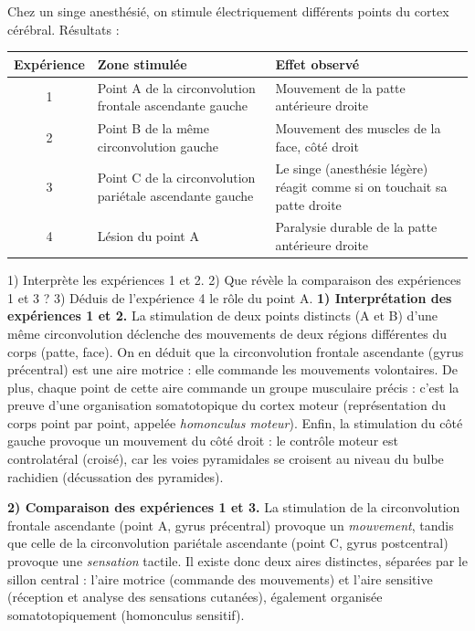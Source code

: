 \documentclass[11pt]{article}
\newcommand{\cle}[1]{{\popxbold\color{popdark}#1}}
\begin{document}
\begin{exoresolu}
Chez un singe anesthésié, on stimule électriquement différents points du cortex cérébral. Résultats :

\begin{center}
\begin{tabularx}{\linewidth}{|c|X|X|}
\hline
\rowcolor{popblueL} Expérience & Zone stimulée & Effet observé \\
\hline
1 & Point A de la circonvolution frontale ascendante gauche & Mouvement de la patte antérieure droite \\
\hline
2 & Point B de la même circonvolution gauche & Mouvement des muscles de la face, côté droit \\
\hline
3 & Point C de la circonvolution pariétale ascendante gauche & Le singe (anesthésie légère) réagit comme si on touchait sa patte droite \\
\hline
4 & Lésion du point A & Paralysie durable de la patte antérieure droite \\
\hline
\end{tabularx}
\end{center}

1) Interprète les expériences 1 et 2. 2) Que révèle la comparaison des expériences 1 et 3 ? 3) Déduis de l'expérience 4 le rôle du point A.
\tcblower
\textbf{1) Interprétation des expériences 1 et 2.} La stimulation de deux points distincts (A et B) d'une même circonvolution déclenche des mouvements de deux régions différentes du corps (patte, face). On en déduit que la circonvolution frontale ascendante (gyrus précentral) est une \cle{aire motrice} : elle commande les mouvements volontaires. De plus, chaque point de cette aire commande un groupe musculaire précis : c'est la preuve d'une \cle{organisation somatotopique} du cortex moteur (représentation du corps point par point, appelée \emph{homonculus moteur}). Enfin, la stimulation du côté gauche provoque un mouvement du côté droit : le contrôle moteur est \cle{controlatéral} (croisé), car les voies pyramidales se croisent au niveau du bulbe rachidien (décussation des pyramides).

\textbf{2) Comparaison des expériences 1 et 3.} La stimulation de la circonvolution frontale ascendante (point A, gyrus précentral) provoque un \emph{mouvement}, tandis que celle de la circonvolution pariétale ascendante (point C, gyrus postcentral) provoque une \emph{sensation} tactile. Il existe donc deux aires distinctes, séparées par le sillon central : l'\cle{aire motrice} (commande des mouvements) et l'\cle{aire sensitive} (réception et analyse des sensations cutanées), également organisée somatotopiquement (homonculus sensitif).


\end{exoresolu}
\end{document}
